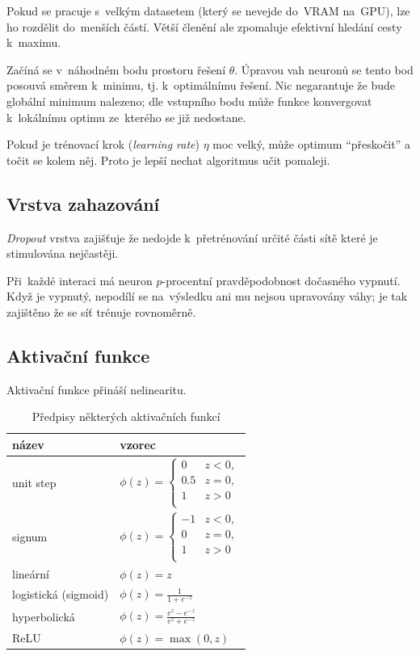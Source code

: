 Pokud se pracuje s~velkým datasetem (který se nevejde do~VRAM na~GPU), lze ho rozdělit do~menších částí.
Větší členění ale zpomaluje efektivní hledání cesty k~maximu.

Začíná se v~náhodném bodu prostoru řešení $\theta$.
Úpravou vah neuronů se tento bod posouvá směrem k~minimu, tj. k~optimálnímu řešení.
Nic negarantuje že bude globální minimum nalezeno; dle vstupního bodu může funkce konvergovat k~lokálnímu optimu ze~kterého se již nedostane.

Pokud je trénovací krok (\emph{learning rate}) $\eta$ moc velký, může optimum \enquote{přeskočit} a točit se kolem něj. Proto je lepší nechat algoritmus učit pomaleji.

\subsection{Vrstva zahazování}

\emph{Dropout} vrstva zajišťuje že nedojde k~přetrénování určité části sítě které je stimulována nejčastěji.

Při~každé interaci má neuron $p$-procentní pravděpodobnost dočasného vypnutí.
Když je vypnutý, nepodílí se na~výsledku ani mu nejsou upravovány váhy; je tak zajištěno že se síť trénuje rovnoměrně.

\subsection{Aktivační funkce}

Aktivační funkce přináší nelinearitu.

\begin{table}[ht]
\onehalfspacing
\centering
\begin{tabular}{|l|l|}
    název & vzorec \\ \hline \hline
    unit step & $\phi(z) = \begin{cases}
    0 & z < 0, \\
    0.5 & z = 0, \\
    1 & z > 0 \\
    \end{cases}$ \\
    signum & $\phi(z) = \begin{cases}
    -1 & z < 0, \\
    0 & z = 0, \\
    1 & z > 0 \\
    \end{cases}$ \\
    lineární & $\phi(z) = z$ \\
    logistická (sigmoid) & $\phi(z) = \frac{1}{1 + e^{-z}}$ \\
    hyperbolická & $\phi(z) = \frac{e^z - e^{-z}}{e^z + e^{-z}}$ \\
    ReLU & $\phi(z) = \max(0, z)$ \\
\end{tabular}
\caption{Předpisy některých aktivačních funkcí}
\end{table}
\FloatBarrier


